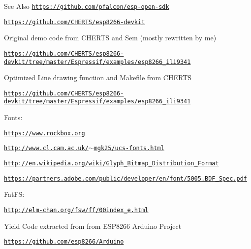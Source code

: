 \begin{DoxySeeAlso}{See Also}
\href{https://github.com/pfalcon/esp-open-sdk}{\tt https\-://github.\-com/pfalcon/esp-\/open-\/sdk} 

\href{https://github.com/CHERTS/esp8266-devkit}{\tt https\-://github.\-com/\-C\-H\-E\-R\-T\-S/esp8266-\/devkit}
\begin{DoxyItemize}
\item Original demo code from C\-H\-E\-R\-T\-S and Sem (mostly rewritten by me) 
\end{DoxyItemize}

\href{https://github.com/CHERTS/esp8266-devkit/tree/master/Espressif/examples/esp8266_ili9341}{\tt https\-://github.\-com/\-C\-H\-E\-R\-T\-S/esp8266-\/devkit/tree/master/\-Espressif/examples/esp8266\-\_\-ili9341}
\begin{DoxyItemize}
\item Optimized Line drawing function and Makefile from C\-H\-E\-R\-T\-S 
\end{DoxyItemize}

\href{https://github.com/CHERTS/esp8266-devkit/tree/master/Espressif/examples/esp8266_ili9341}{\tt https\-://github.\-com/\-C\-H\-E\-R\-T\-S/esp8266-\/devkit/tree/master/\-Espressif/examples/esp8266\-\_\-ili9341}
\begin{DoxyItemize}
\item Fonts\-: 
\end{DoxyItemize}

\href{https://www.rockbox.org}{\tt https\-://www.\-rockbox.\-org} 

\href{http://www.cl.cam.ac.uk/~mgk25/ucs-fonts.html}{\tt http\-://www.\-cl.\-cam.\-ac.\-uk/$\sim$mgk25/ucs-\/fonts.\-html} 

\href{http://en.wikipedia.org/wiki/Glyph_Bitmap_Distribution_Format}{\tt http\-://en.\-wikipedia.\-org/wiki/\-Glyph\-\_\-\-Bitmap\-\_\-\-Distribution\-\_\-\-Format} 

\href{https://partners.adobe.com/public/developer/en/font/5005.BDF_Spec.pdf}{\tt https\-://partners.\-adobe.\-com/public/developer/en/font/5005.\-B\-D\-F\-\_\-\-Spec.\-pdf}
\begin{DoxyItemize}
\item Fat\-F\-S\-: 
\end{DoxyItemize}

\href{http://elm-chan.org/fsw/ff/00index_e.html}{\tt http\-://elm-\/chan.\-org/fsw/ff/00index\-\_\-e.\-html}
\begin{DoxyItemize}
\item Yield Code extracted from from E\-S\-P8266 Arduino Project 
\end{DoxyItemize}

\href{https://github.com/esp8266/Arduino}{\tt https\-://github.\-com/esp8266/\-Arduino} 


\end{DoxySeeAlso}
